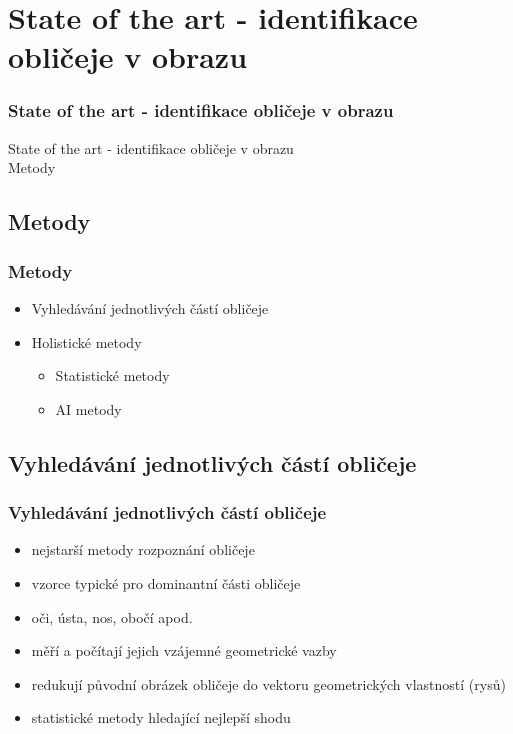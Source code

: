 \documentclass{beamer}
\begin{document}
\section{State of the art - identifikace obličeje v obrazu}
\begin{frame}

\begin{center}
\frametitle{State of the art - identifikace obličeje v obrazu}
	\huge State of the art - identifikace obličeje v obrazu\\[1.5cm]
	\large Metody
\end{center}

\end{frame}

\subsection{Metody}
\begin{frame}
\frametitle{Metody}
\begin{itemize}
	\item Vyhledávání jednotlivých částí obličeje
	\item Holistické metody
		\begin{itemize}
			\item Statistické metody
			\item AI metody
		\end{itemize}
\end{itemize}
\end{frame}

\subsection{Vyhledávání jednotlivých částí obličeje}
\begin{frame}
\frametitle{Vyhledávání jednotlivých částí obličeje}
\begin{itemize}
			\item nejstarší metody rozpoznání obličeje
			\item vzorce typické pro dominantní části obličeje
			\item oči, ústa, nos, obočí apod.
			\item měří a počítají jejich vzájemné geometrické vazby
			\item redukují původní obrázek obličeje do vektoru geometrických vlastností (rysů)
			\item statistické metody hledající nejlepší shodu
		\end{itemize}
\end{frame}
\end{document}
